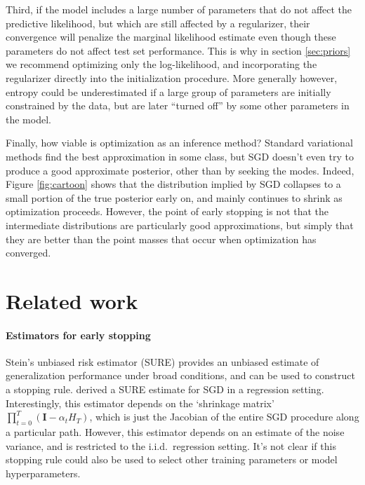 \documentclass[]{article}
\newcommand{\vI}{\mathbf{I}}
\def\iid{i.i.d.\ }
\newcommand{\stepsize}{\alpha}
\begin{document}
Third, if the model includes a large number of parameters that do not affect the predictive likelihood, but which are still affected by a regularizer, their convergence will penalize the marginal likelihood estimate even though these parameters do not affect test set performance.
This is why in section \ref{sec:priors} we recommend optimizing only the log-likelihood, and incorporating the regularizer directly into the initialization procedure.
More generally however, entropy could be underestimated if a large group of parameters are initially constrained by the data, but are later ``turned off'' by some other parameters in the model.

Finally, how viable is optimization as an inference method?
Standard variational methods find the best approximation in some class, but SGD doesn't even try to produce a good approximate posterior, other than by seeking the modes.
Indeed, Figure \ref{fig:cartoon} shows that the distribution implied by SGD collapses to a small portion of the true posterior early on, and mainly continues to shrink as optimization proceeds.
However, the point of early stopping is not that the intermediate distributions are particularly good approximations, but simply that they are better than the point masses that occur when optimization has converged.


\section{Related work}

\paragraph{Estimators for early stopping}
Stein's unbiased risk estimator (SURE) \citep{stein1981estimation} provides an unbiased estimate of generalization performance under broad conditions, and can be used to construct a stopping rule.
\citet{raskutti2014early} derived a SURE estimate for SGD in a regression setting.
Interestingly, this estimator depends on the `shrinkage matrix' $\prod_{t=0}^{T} \left( \vI - \stepsize_t H_T \right)$, which is just the Jacobian of the entire SGD procedure along a particular path.
However, this estimator depends on an estimate of the noise variance, and is restricted to the \iid regression setting.
It's not clear if this stopping rule could also be used to select other training parameters or model hyperparameters.
\end{document}
